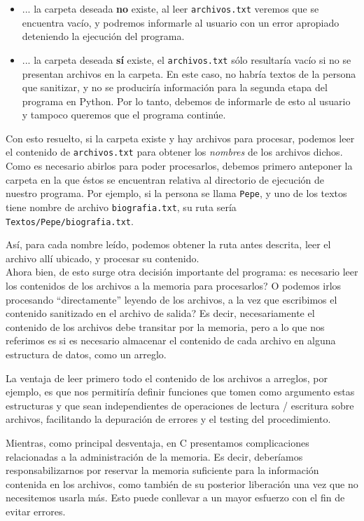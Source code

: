 \documentclass[a4paper]{article}
\begin{document}
\begin{itemize}
    \item ... la carpeta deseada \textbf{no} existe, al leer \texttt{archivos.txt} veremos que se encuentra vacío, y podremos informarle al usuario con un error apropiado deteniendo la ejecución del programa.
    \item ... la carpeta deseada \textbf{sí} existe, el \texttt{archivos.txt} sólo resultaría vacío si no se presentan archivos en la carpeta. En este caso, no habría textos de la persona que sanitizar, y no se produciría información para la segunda etapa del programa en Python. Por lo tanto, debemos de informarle de esto al usuario y tampoco queremos que el programa continúe.
\end{itemize}

Con esto resuelto, si la carpeta existe y hay archivos para procesar, podemos leer el contenido de \texttt{archivos.txt} para obtener los \textit{nombres} de los archivos dichos. Como es necesario abirlos para poder procesarlos, debemos primero anteponer la carpeta en la que éstos se encuentran relativa al directorio de ejecución de nuestro programa. Por ejemplo, si la persona se llama \texttt{Pepe}, y uno de los textos tiene nombre de archivo \texttt{biografia.txt}, su ruta sería \texttt{Textos/Pepe/biografia.txt}.

Así, para cada nombre leído, podemos obtener la ruta antes descrita, leer el archivo allí ubicado, y procesar su contenido. \\

Ahora bien, de esto surge otra decisión importante del programa: es necesario leer los contenidos de los archivos a la memoria para procesarlos? O podemos irlos procesando ``directamente'' leyendo de los archivos, a la vez que escribimos el contenido sanitizado en el archivo de salida?
Es decir, necesariamente el contenido de los archivos debe transitar por la memoria, pero a lo que nos referimos es si es necesario almacenar el contenido de cada archivo en alguna estructura de datos, como un arreglo.

La ventaja de leer primero todo el contenido de los archivos a arreglos, por ejemplo, es que nos permitiría definir funciones que tomen como argumento estas estructuras y que sean independientes de operaciones de lectura / escritura sobre archivos, facilitando la depuración de errores y el testing del procedimiento.

Mientras, como principal desventaja, en C presentamos complicaciones relacionadas a la administración de la memoria. Es decir, deberíamos responsabilizarnos por reservar la memoria suficiente para la información contenida en los archivos, como también de su posterior liberación una vez que no necesitemos usarla más. Esto puede conllevar a un mayor esfuerzo con el fin de evitar errores.
\end{document}
